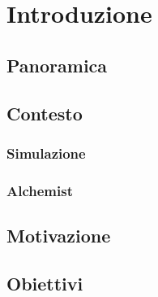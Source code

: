 \chapter{Introduzione}
\label{chap:introduction}

\section{Panoramica}

\section{Contesto}
\subsection{Simulazione}
\subsection{Alchemist}
\section{Motivazione}
\section{Obiettivi}
